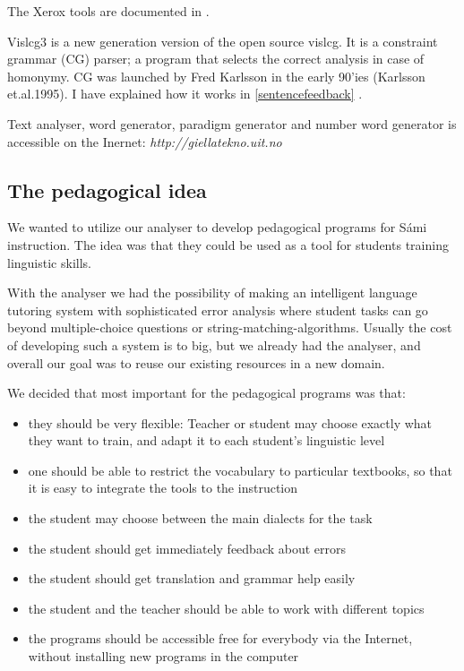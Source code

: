 \documentclass[a4paper,12pt]{article}
\begin{document}
The Xerox tools are documented in \citep{BeesleyKarttunen}. 

Vislcg3 is a new generation version of the open source vislcg. It is a constraint grammar (CG) parser; a program that selects the correct analysis in case of homonymy. CG was launched by Fred Karlsson in the early 90'ies (Karlsson et.al.1995). I have explained how it works in \ref{sentencefeedback}
.

Text analyser, word generator, paradigm generator and number word generator is accessible on the Inernet: \textit{http://giellatekno.uit.no}

\subsection{The pedagogical idea}
We wanted to utilize our analyser to develop pedagogical programs for Sámi instruction. The idea was that they could be used as a tool for students training linguistic skills. 

With the analyser we had the possibility of making an intelligent language tutoring system with sophisticated error analysis where student tasks can go beyond multiple-choice questions or string-matching-algorithms. Usually the cost of developing such a system is to big, but we already had the analyser, and overall our goal was to reuse our existing resources in a new domain.

We decided that most important for the pedagogical programs was that:

\begin{itemize}
\item they should be very flexible: Teacher or student may choose exactly what they want to train, and adapt it to each student's linguistic level 
\item one should be able to restrict the vocabulary to particular textbooks, so that it is easy to integrate the tools to the instruction
\item the student may choose between the main dialects for the task
\item the student should get immediately feedback about errors
\item the student should get translation and grammar help easily
\item the student and the teacher should be able to work with different topics 
\item the programs should be accessible free for everybody via the Internet, without installing new programs in the computer
\end{itemize}
\end{document}
